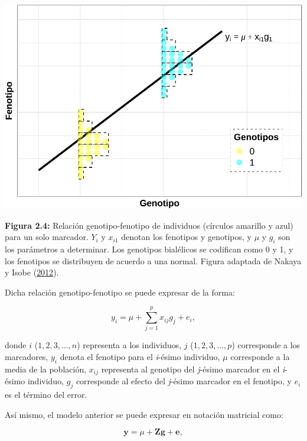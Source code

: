 \documentclass[11pt,spanish,a4paper,oneside,]{book} %
\begin{document}
\begin{center}\includegraphics[width=1\linewidth]{figures/Mod_RL} \end{center}

\textbf{Figura 2.4:} Relación genotipo-fenotipo de individuos (círculos amarillo y azul) para un solo marcador. \(Y_{i}\) y \(x_{i1}\) denotan los fenotipos y genotipos, y \(\mu\) y \(g_{i}\) son los parámetros a determinar. Los genotipos bialélicos se codifican como 0 y 1, y los fenotipos se distribuyen de acuerdo a una normal. Figura adaptada de Nakaya y Isobe (\protect\hyperlink{ref-cite:6}{2012}).

Dicha relación genotipo-fenotipo se puede expresar de la forma:

\begin{equation}
y_{i} = \mu + \sum_{j = 1}^{p}x_{ij}g_{j} + e_{i},
\end{equation}

donde \(i\) (\(1, 2, 3, …, n\)) representa a los individuos, \(j\) (\(1, 2, 3, …, p\)) corresponde a los marcadores, \(y_{i}\) denota el fenotipo para el \emph{i}-ésimo individuo, \(\mu\) corresponde a la media de la población, \(x_{ij}\) representa al genotipo del \emph{j}-ésimo marcador en el \emph{i}-ésimo individuo, \(g_{j}\) corresponde al efecto del \emph{j}-ésimo marcador en el fenotipo, y \(e_{i}\) es el término del error.

Así mismo, el modelo anterior se puede expresar en notación matricial como:

\begin{equation}
\textbf{y} = \mu + \textbf{Z} \textbf{g} + \textbf{e},
\end{equation}
\end{document}
